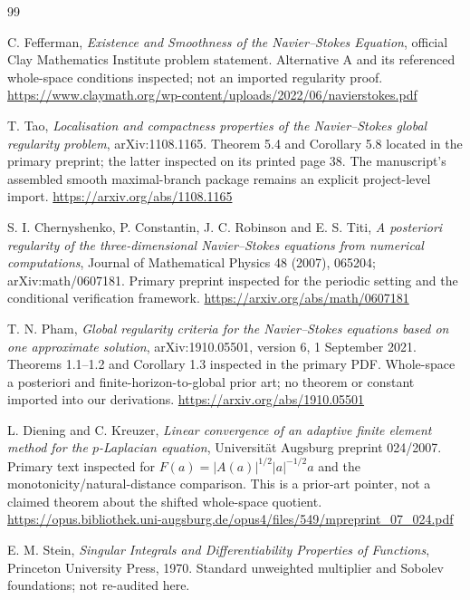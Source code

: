 \documentclass[11pt,a4paper]{article}
\theoremstyle{definition}\newtheorem{definition}[theorem]{Definition}
\theoremstyle{remark}\newtheorem{remark}[theorem]{Remark}
\numberwithin{equation}{section}
\begin{document}
\begin{thebibliography}{99}
 C. Fefferman, \emph{Existence and Smoothness of the Navier--Stokes Equation}, official Clay Mathematics Institute problem statement. Alternative A and its referenced whole-space conditions inspected; not an imported regularity proof.\newline
\url{https://www.claymath.org/wp-content/uploads/2022/06/navierstokes.pdf}

 T. Tao, \emph{Localisation and compactness properties of the Navier--Stokes global regularity problem}, arXiv:1108.1165. Theorem 5.4 and Corollary 5.8 located in the primary preprint; the latter inspected on its printed page 38. The manuscript's assembled smooth maximal-branch package remains an explicit project-level import.\newline
\url{https://arxiv.org/abs/1108.1165}

 S. I. Chernyshenko, P. Constantin, J. C. Robinson and E. S. Titi, \emph{A posteriori regularity of the three-dimensional Navier--Stokes equations from numerical computations}, Journal of Mathematical Physics 48 (2007), 065204; arXiv:math/0607181. Primary preprint inspected for the periodic setting and the conditional verification framework.\newline
\url{https://arxiv.org/abs/math/0607181}

 T. N. Pham, \emph{Global regularity criteria for the Navier--Stokes equations based on one approximate solution}, arXiv:1910.05501, version 6, 1 September 2021. Theorems 1.1--1.2 and Corollary 1.3 inspected in the primary PDF. Whole-space a posteriori and finite-horizon-to-global prior art; no theorem or constant imported into our derivations.\newline
\url{https://arxiv.org/abs/1910.05501}

 L. Diening and C. Kreuzer, \emph{Linear convergence of an adaptive finite element method for the $p$-Laplacian equation}, Universit\"at Augsburg preprint 024/2007. Primary text inspected for $F(a)=|A(a)|^{1/2}|a|^{-1/2}a$ and the monotonicity/natural-distance comparison. This is a prior-art pointer, not a claimed theorem about the shifted whole-space quotient.\newline
\url{https://opus.bibliothek.uni-augsburg.de/opus4/files/549/mpreprint_07_024.pdf}

 E. M. Stein, \emph{Singular Integrals and Differentiability Properties of Functions}, Princeton University Press, 1970. Standard unweighted multiplier and Sobolev foundations; not re-audited here.


\end{thebibliography}
\end{document}
